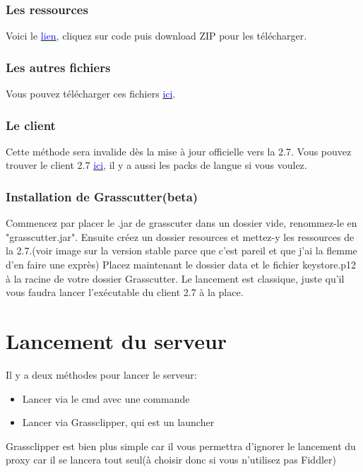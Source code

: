 \documentclass{article}
\begin{document}
\subsubsection{Les ressources}
Voici le \href{https://github.com/Koko-boya/Grasscutter_Resources/tree/2.7}{\textcolor{blue}{lien}}, cliquez sur code puis download ZIP pour les télécharger.\newline

\subsubsection{Les autres fichiers}
Vous pouvez télécharger ces fichiers \href{https://drive.google.com/file/d/12UwtBJnrxg1ZoNRVzXu9evL707Pi0bem/view?usp=sharing}{\textcolor{blue}{ici}}.

\subsubsection{Le client}
Cette méthode sera invalide dès la mise à jour officielle vers la 2.7.\newline\newline
Vous pouvez trouver le client 2.7 \href{https://www.reddit.com/r/Genshin_Impact/comments/uyou43/direct_download_links_for_genshin_impact_27_from/}{\textcolor{blue}{ici}}, il y a aussi les packs de langue si vous voulez.

\subsubsection{Installation de Grasscutter(beta)}
Commencez par placer le .jar de grasscuter dans un dossier vide, renommez-le en "grasscutter.jar".\newline
Ensuite créez un dossier resources et mettez-y les ressources de la 2.7.(voir image sur la version stable parce que c'est pareil et que j'ai la flemme d'en faire une exprès)\newline
Placez maintenant le dossier data et le fichier keystore.p12 à la racine de votre dossier Grasscutter.	\newline
Le lancement est classique, juste qu'il vous faudra lancer l'exécutable du client 2.7 à la place.

\hrulefill

\section{Lancement du serveur}
Il y a deux méthodes pour lancer le serveur:
\begin{itemize}
	\item Lancer via le cmd avec une commande
	\item Lancer via Grassclipper, qui est un launcher
\end{itemize}
Grassclipper est bien plus simple car il vous permettra d'ignorer le lancement du proxy car il se lancera tout seul(à choisir donc si vous n'utilisez pas Fiddler)
\end{document}
